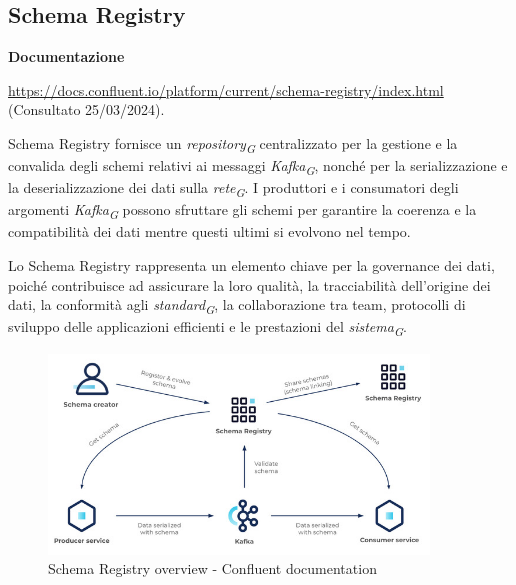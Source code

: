 \subsection{Schema Registry} \label{sec:schema_registry}

\textbf{Documentazione}

\href{https://docs.confluent.io/platform/current/schema-registry/index.html}{https://docs.confluent.io/platform/current/schema-registry/index.html} (Consultato 25/03/2024).

Schema Registry fornisce un \textit{repository}\textsubscript{\textit{G}} centralizzato per la gestione e la convalida degli schemi relativi ai messaggi \textit{Kafka}\textsubscript{\textit{G}}, nonché per la serializzazione e la deserializzazione dei dati sulla \textit{rete}\textsubscript{\textit{G}}. I produttori e i consumatori degli argomenti \textit{Kafka}\textsubscript{\textit{G}} possono sfruttare gli schemi per garantire la coerenza e la compatibilità dei dati mentre questi ultimi si evolvono nel tempo.

Lo Schema Registry rappresenta un elemento chiave per la governance dei dati, poiché contribuisce ad assicurare la loro qualità, la tracciabilità dell'origine dei dati, la conformità agli \textit{standard}\textsubscript{\textit{G}}, la collaborazione tra team, protocolli di sviluppo delle applicazioni efficienti e le prestazioni del \textit{sistema}\textsubscript{\textit{G}}.

\begin{figure}[H]
    \centering
    \includegraphics[width=0.9\textwidth]{../Images/SpecificaTecnica/schemaRegistry.jpg}
    \caption{Schema Registry overview - Confluent documentation}
    \label{fig:schemaReg}
\end{figure}

